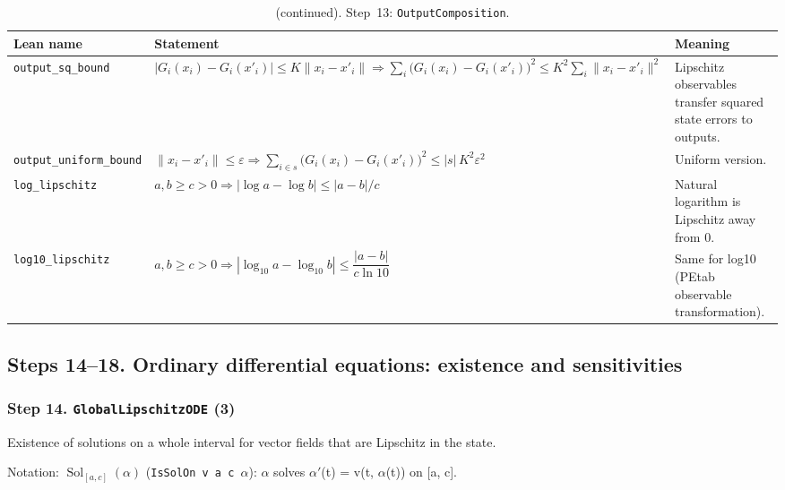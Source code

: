 \addtocounter{table}{-1}
{\small
\begin{longtable}{@{}>{\raggedright\arraybackslash}p{3.6cm}>{\raggedright\arraybackslash}p{6.6cm}>{\raggedright\arraybackslash}p{5.6cm}@{}}
\caption[]{(continued). Step~13: \texttt{OutputComposition}.}\\
\toprule
Lean name & Statement & Meaning \\
\midrule
\endhead
\texttt{output\_\allowbreak{}sq\_\allowbreak{}bound} & $\displaystyle |G_i(x_i)-G_i(x'_i)|\le K\|x_i-x'_i\|\Rightarrow\sum_i\bigl(G_i(x_i)-G_i(x'_i)\bigr)^2\le K^2\sum_i\|x_i-x'_i\|^2$ & Lipschitz observables transfer squared state errors to outputs. \\[3pt]
\texttt{output\_\allowbreak{}uniform\_\allowbreak{}bound} & $\displaystyle \|x_i-x'_i\|\le\varepsilon\Rightarrow\sum_{i\in s}\bigl(G_i(x_i)-G_i(x'_i)\bigr)^2\le|s|\,K^2\varepsilon^2$ & Uniform version. \\[3pt]
\texttt{log\_\allowbreak{}lipschitz} & $\displaystyle a,b\ge c>0\Rightarrow|\log a-\log b|\le|a-b|/c$ & Natural logarithm is Lipschitz away from 0. \\[3pt]
\texttt{log10\_\allowbreak{}lipschitz} & $\displaystyle a,b\ge c>0\Rightarrow|\log_{10}a-\log_{10}b|\le\dfrac{|a-b|}{c\ln10}$ & Same for log10 (PEtab observable transformation). \\[3pt]
\bottomrule
\end{longtable}
}

\subsection*{Steps 14--18. Ordinary differential equations: existence and sensitivities}

\subsubsection*{Step 14. \texttt{GlobalLipschitzODE} (3)}
Existence of solutions on a whole interval for vector fields that are Lipschitz in the state.

{\small\raggedright Notation: $\operatorname{Sol}_{[a,c]}(\alpha)$ (\texttt{IsSolOn v a c $\alpha$}): $\alpha$ solves $\alpha'$(t) = v(t, $\alpha$(t)) on [a, c].}

